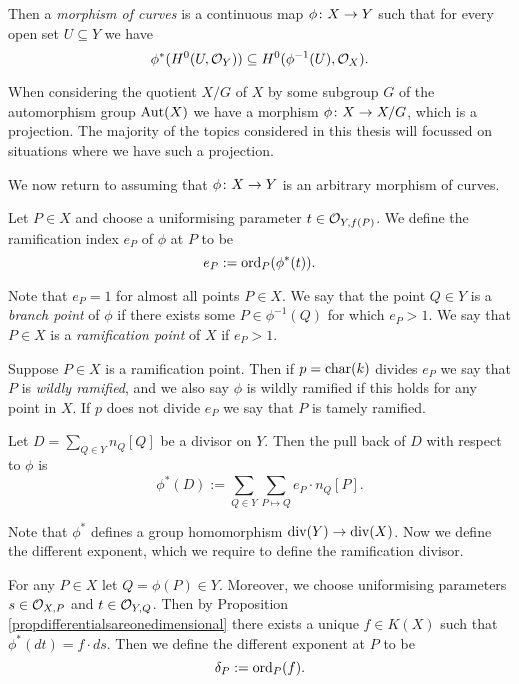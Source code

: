 Then a \emph{morphism of curves} is a continuous map $\phi \colon X \rightarrow Y$ such that for every open set $U \subseteq Y$ we have
    \[
    \phi^*(H^0(U,{\cal O}_Y)) \subseteq H^0(\phi^{-1}(U),{\cal O}_X).
    \]

When considering the quotient $X/G$ of $X$ by some subgroup $G$ of the automorphism group $\operatorname{Aut}(X)$ we have a morphism $\phi \colon X \rightarrow X/G$, which is a projection.
The majority of the topics considered in this thesis will focussed on situations where we have such a projection.

We now return to assuming that $\phi \colon X \rightarrow Y$ is an arbitrary morphism of curves.
    \begin{defn}
    Let $P \in X$ and choose a uniformising parameter $t \in {\cal O}_{Y,f(P)}$.
    We define the ramification index $e_P$ of $\phi$ at $P$ to be
        \[
        e_P := \operatorname{ord}_P(\phi^*(t)).
        \]
    \end{defn}

Note that $e_P =1$ for almost all points $P \in X$.
We say that the point $Q \in Y$ is a \emph{branch point} of $\phi$ if there exists some $P \in \phi^{-1}(Q)$ for which $e_P >1$.
We say that $P \in X$ is a \emph{ramification point} of $X$ if $e_P >1$.

    
Suppose $P \in X$ is a ramification point.
Then if $p = \operatorname{char}(k)$ divides $e_P$ we say that $P$ is \emph{wildly ramified}, and we also say $\phi$ is wildly ramified if this holds for any point in $X$.
If $p$ does not divide $e_P$ we say that $P$ is tamely ramified.

    \begin{defn}
    Let $D = \sum_{Q \in Y}n_Q [Q]$ be a divisor on $Y$.
    Then the pull back of $D$ with respect to $\phi$ is
        \[
        \phi^*(D) := \sum_{Q \in Y} \sum_{P \mapsto Q} e_P \cdot n_Q [P].
        \]
    \end{defn}

Note that $\phi^*$ defines a group homomorphism $\operatorname{div}(Y) \rightarrow \operatorname{div}(X)$.
Now we define the different exponent, which we require to define the ramification divisor.
    
    \begin{defn}
    For any $P\in X$ let $Q = \phi(P) \in Y$.
    Moreover, we choose uniformising parameters $s \in {\cal O}_{X,P}$ and $t \in {\cal O}_{Y,Q}$.
    Then by Proposition \ref{propdifferentialsareonedimensional} there exists a unique $f \in K(X)$ such that $\phi^*(dt) = f\cdot ds$.
    Then we define the different exponent at $P$ to be 
        \[
        \delta_P : = \operatorname{ord}_P(f).
        \]
    \end{defn}

